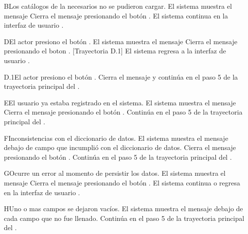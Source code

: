 \begin{UCtrayectoriaA}{B}{Los catálogos de la  necesarios no se pudieron cargar.}
	\UCpaso El sistema muestra el mensaje 
	\UCpaso[\UCactor] Cierra el mensaje presionando el botón .
	\UCpaso El sistema continua en la interfaz de usuario .
\end{UCtrayectoriaA}

\begin{UCtrayectoriaA}{D}{El actor presiono el botón .}
	\UCpaso El sistema muestra el mensaje 
	\UCpaso[\UCactor] Cierra el mensaje presionando el boton . [Trayectoria D.1]
	\UCpaso El sistema regresa a la interfaz de usuario .
\end{UCtrayectoriaA}

\begin{UCtrayectoriaA}{D.1}{El actor presiono el botón .}
	\UCpaso Cierra el mensaje y continúa en el paso 5 de la trayectoria principal del .	
\end{UCtrayectoriaA}

\begin{UCtrayectoriaA}{E}{El usuario ya estaba registrado en el sistema.}
	\UCpaso El sistema muestra el mensaje  
	\UCpaso[\UCactor] Cierra el mensaje presionando el botón .
	\UCpaso Continúa en el paso 5 de la trayectoria principal del .
\end{UCtrayectoriaA}

\begin{UCtrayectoriaA}{F}{Inconsistencias con el diccionario de datos.}
		\UCpaso El sistema muestra el mensaje  debajo de campo que incumplió con el diccionario de datos.
		\UCpaso[\UCactor] Cierra el mensaje presionando el botón .
		\UCpaso Continúa en el paso 5 de la trayectoria principal del .
	\end{UCtrayectoriaA}
	
	
	
	\begin{UCtrayectoriaA}{G}{Ocurre un error al momento de persistir los datos.}
		\UCpaso El sistema muestra el mensaje 
		\UCpaso[\UCactor] Cierra el mensaje presionando el botón .
		\UCpaso El sistema continua o regresa en la interfaz de usuario .
	\end{UCtrayectoriaA}
	
	
	\begin{UCtrayectoriaA}{H}{Uno o mas campos se dejaron vacíos.}
		\UCpaso El sistema muestra el mensaje  debajo de cada campo que no fue llenado. 
		\UCpaso	Continúa en el paso 5 de la trayectoria principal del .
	\end{UCtrayectoriaA}
